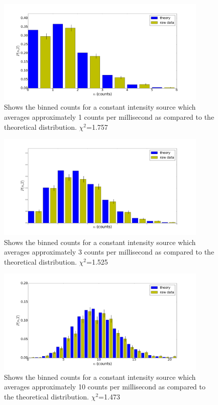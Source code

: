 \documentclass[prb,preprint]{revtex4-1}
\begin{document}
\begin{figure}[h]
\centering
\includegraphics[width=0.9\textwidth]{1kc.png}
\caption{Shows the binned counts for a constant intensity source which averages approximately 1 counts per millisecond as compared to the theoretical distribution. $\chi^2$=1.757}
\label{LC2}
\end{figure}

\begin{figure}[h]
\centering
\includegraphics[width=0.9\textwidth]{3kc.png}
\caption{Shows the binned counts for a constant intensity source which averages approximately 3 counts per millisecond as compared to the theoretical distribution. $\chi^2$=1.525}
\label{LC2}
\end{figure}

\newpage

\begin{figure}[h]
\centering
\includegraphics[width=0.9\textwidth]{10kc.png}
\caption{Shows the binned counts for a constant intensity source which averages approximately 10 counts per millisecond as compared to the theoretical distribution. $\chi^2$=1.473}
\label{LC2}
\end{figure}
\end{document}
